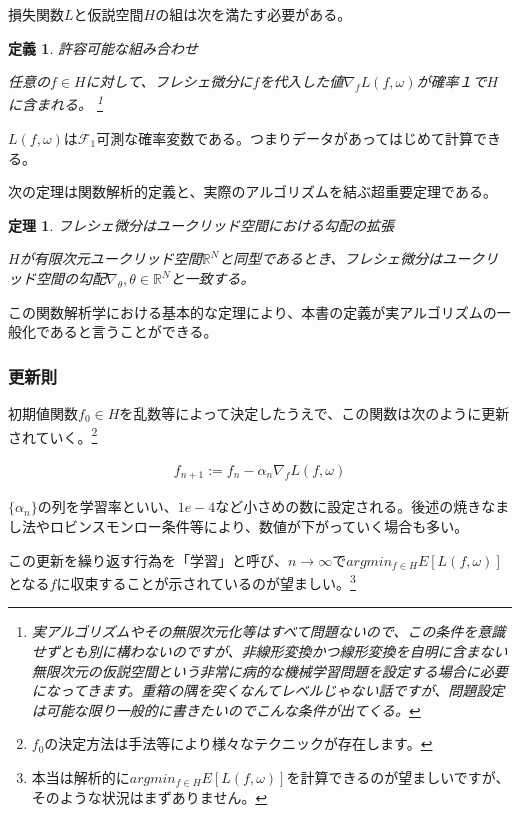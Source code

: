 \documentclass{jsarticle}
\newtheorem{theo}{定理}[section]
\newtheorem{defi}{定義}[section]
\begin{document}
損失関数$L$と仮説空間$H$の組は次を満たす必要がある。
\begin{defi} 許容可能な組み合わせ

任意の$f\in H$に対して、フレシェ微分に$f$を代入した値$\nabla_fL(f,\omega)$が確率１で$H$に含まれる。
\footnote{実アルゴリズムやその無限次元化等はすべて問題ないので、この条件を意識せずとも別に構わないのですが、非線形変換かつ線形変換を自明に含まない無限次元の仮説空間という非常に病的な機械学習問題を設定する場合に必要になってきます。重箱の隅を突くなんてレベルじゃない話ですが、問題設定は可能な限り一般的に書きたいのでこんな条件が出てくる。}
\end{defi}

$L(f,\omega)$は$\mathcal{F}_1$可測な確率変数である。つまりデータがあってはじめて計算できる。

次の定理は関数解析的定義と、実際のアルゴリズムを結ぶ超重要定理である。

\begin{theo}フレシェ微分はユークリッド空間における勾配の拡張

$H$が有限次元ユークリッド空間$\mathbb{R}^N$と同型であるとき、フレシェ微分はユークリッド空間の勾配$\nabla_\theta,\theta\in\mathbb{R}^N$と一致する。

\end{theo}

この関数解析学における基本的な定理により、本書の定義が実アルゴリズムの一般化であると言うことができる。

\subsubsection{更新則}

初期値関数$f_0\in H$を乱数等によって決定したうえで、この関数は次のように更新されていく。\footnote{$f_0$の決定方法は手法等により様々なテクニックが存在します。}

\begin{align}
f_{n+1}:=f_n-\alpha_n \nabla_f L(f,\omega)
\end{align}

$\{\alpha_n\}$の列を学習率といい、$1e-4$など小さめの数に設定される。後述の焼きなまし法やロビンスモンロー条件等により、数値が下がっていく場合も多い。

この更新を繰り返す行為を「学習」と呼び、$n\to \infty$で$argmin_{f\in H} E[L(f,\omega)]$となる$f$に収束することが示されているのが望ましい。\footnote{本当は解析的に$argmin_{f\in H} E[L(f,\omega)]$を計算できるのが望ましいですが、そのような状況はまずありません。}
\end{document}
